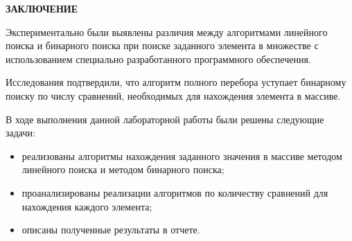 \begin{center}
    \textbf{ЗАКЛЮЧЕНИЕ}
\end{center}

Экспериментально были выявлены различия между алгоритмами линейного поиска и бинарного поиска при поиске заданного элемента в множестве с использованием специально разработанного программного обеспечения.

Исследования подтвердили, что алгоритм полного перебора уступает бинарному поиску по числу сравнений, необходимых для нахождения элемента в массиве.

\vspace{5mm}

В ходе выполнения данной лабораторной работы были решены следующие задачи:
\begin{itemize}
	\item реализованы алгоритмы нахождения заданного значения в массиве методом линейного поиска и методом бинарного поиска;
 \item проанализированы реализации алгоритмов по количеству сравнений для нахождения каждого элемента;
 \item описаны полученные результаты в отчете.
\end{itemize}